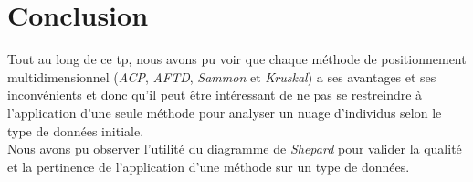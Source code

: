 \documentclass[a4paper, 10pt]{article}
\begin{document}
\section*{Conclusion}
Tout au long de ce tp, nous avons pu voir que chaque méthode de positionnement multidimensionnel (\textit{ACP}, \textit{AFTD},
\textit{Sammon} et \textit{Kruskal}) a ses avantages et ses inconvénients et donc qu'il peut être intéressant
de ne pas se restreindre à l'application d'une seule méthode pour analyser un nuage d'individus selon le type de données initiale.\\
Nous avons pu observer l'utilité du diagramme de \textit{Shepard} pour valider la qualité et la pertinence de l'application d'une méthode
sur un type de données.
\end{document}
